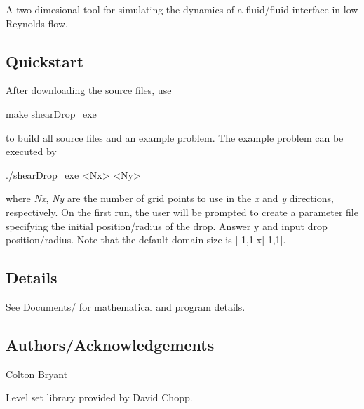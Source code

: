 A two dimesional tool for simulating the dynamics of a fluid/fluid interface in low Reynolds flow.

\subsection*{Quickstart}

After downloading the source files, use 
\begin{DoxyCode}
make shearDrop\_exe
\end{DoxyCode}
 to build all source files and an example problem. The example problem can be executed by 
\begin{DoxyCode}
./shearDrop\_exe <Nx> <Ny>
\end{DoxyCode}
 where {\itshape Nx}, {\itshape Ny} are the number of grid points to use in the {\itshape x} and {\itshape y} directions, respectively. On the first run, the user will be prompted to create a parameter file specifying the initial position/radius of the drop. Answer {\ttfamily y} and input drop position/radius. Note that the default domain size is {\ttfamily \mbox{[}-\/1,1\mbox{]}x\mbox{[}-\/1,1\mbox{]}}.

\subsection*{Details}

See Documents/ for mathematical and program details.

\subsection*{Authors/\+Acknowledgements}

Colton Bryant

Level set library provided by David Chopp. 